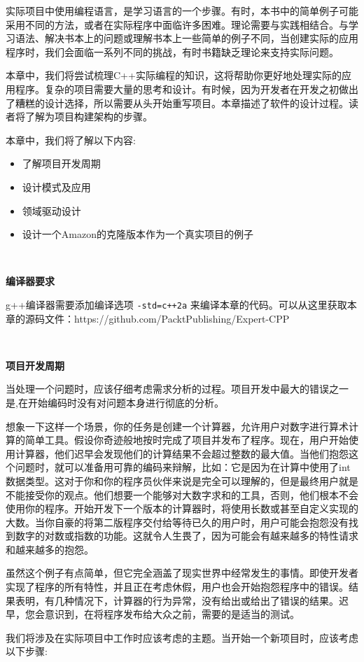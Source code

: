 实际项目中使用编程语言，是学习语言的一个步骤。有时，本书中的简单例子可能采用不同的方法，或者在实际程序中面临许多困难。理论需要与实践相结合。与学习语法、解决书本上的问题或理解书本上一些简单的例子不同，当创建实际的应用程序时，我们会面临一系列不同的挑战，有时书籍缺乏理论来支持实际问题。 \par
本章中，我们将尝试梳理C++实际编程的知识，这将帮助你更好地处理实际的应用程序。复杂的项目需要大量的思考和设计。有时候，因为开发者在开发之初做出了糟糕的设计选择，所以需要从头开始重写项目。本章描述了软件的设计过程。读者将了解为项目构建架构的步骤。\par
本章中，我们将了解以下内容: \par

\begin{itemize}
	\item 了解项目开发周期
	\item 设计模式及应用
	\item 领域驱动设计
	\item 设计一个Amazon的克隆版本作为一个真实项目的例子
\end{itemize}

\noindent\textbf{}\ \par
\textbf{编译器要求} \ \par
g++编译器需要添加编译选项 \texttt{-std=c++2a} 来编译本章的代码。可以从这里获取本章的源码文件：https:/​/github.​com/PacktPublishing/Expert-CPP \par

\noindent\textbf{}\ \par
\textbf{项目开发周期} \ \par
当处理一个问题时，应该仔细考虑需求分析的过程。项目开发中最大的错误之一是,在开始编码时没有对问题本身进行彻底的分析。 \par
想象一下这样一个场景，你的任务是创建一个计算器，允许用户对数字进行算术计算的简单工具。假设你奇迹般地按时完成了项目并发布了程序。现在，用户开始使用计算器，他们迟早会发现他们的计算结果不会超过整数的最大值。当他们抱怨这个问题时，就可以准备用可靠的编码来辩解，比如：它是因为在计算中使用了int数据类型。这对于你和你的程序员伙伴来说是完全可以理解的，但是最终用户就是不能接受你的观点。他们想要一个能够对大数字求和的工具，否则，他们根本不会使用你的程序。开始开发下一个版本的计算器时，将使用长数或甚至自定义实现的大数。当你自豪的将第二版程序交付给等待已久的用户时，用户可能会抱怨没有找到数字的对数或指数的功能。这就令人生畏了，因为可能会有越来越多的特性请求和越来越多的抱怨。 \par
虽然这个例子有点简单，但它完全涵盖了现实世界中经常发生的事情。即使开发者实现了程序的所有特性，并且正在考虑休假，用户也会开始抱怨程序中的错误。结果表明，有几种情况下，计算器的行为异常，没有给出或给出了错误的结果。迟早，您会意识到，在将程序发布给大众之前，需要的是适当的测试。 \par
我们将涉及在实际项目中工作时应该考虑的主题。当开始一个新项目时，应该考虑以下步骤: \par

